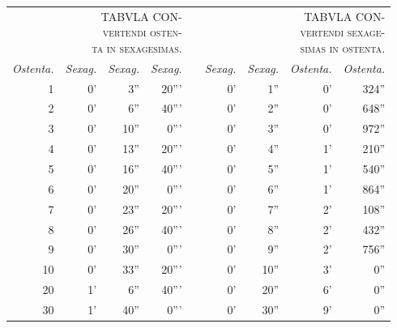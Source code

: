 \begin{parnumbers}
\begin{wraptable}{r}{0mm}
\footnotesize
\setlength{\tabcolsep}{3pt}
\renewcommand{\arraystretch}{1.1}
\begin{tabular}{ |r @{}| r  r  r | c |r | r | r r | }
\multicolumn{4}{p{3cm}}{\parbox[t]{3cm}
 {\scshape\small TABVLA CON-\\
 \footnotesize vertendi osten-\\
 \upshape ta in sexagesimas.}}
& \multicolumn{1}{c}{} &
\multicolumn{4}{p{3cm}}{\parbox[t]{3cm}
 {\scshape\small TABVLA CON-\\
 \footnotesize vertendi sexage-\\
 \upshape simas in ostenta.}}
\\
\cline{1-4} \cline{6-9}
\itshape\scriptsize Ostenta. &
\itshape\scriptsize Sexag. &
\itshape\scriptsize Sexag. &
\itshape\scriptsize Sexag. &
\hspace{5mm} &
\itshape\scriptsize Sexag. &
\itshape\scriptsize Sexag. &
\itshape\scriptsize Ostenta. &
\itshape\scriptsize Ostenta.
\\
\cline{1-4} \cline{6-9}
   1 &  0' &  3'' & 20''' & &  0' &  1'' &    0' & 324'' \\
\cline{2-4} \cline{8-9}
   2 &  0' &  6'' & 40''' & &  0' &  2'' &    0' & 648'' \\
\cline{2-4} \cline{8-9}
   3 &  0' & 10'' &  0''' & &  0' &  3'' &    0' & 972'' \\
\cline{2-4} \cline{8-9}
   4 &  0' & 13'' & 20''' & &  0' &  4'' &    1' & 210'' \\
\cline{2-4} \cline{8-9}
   5 &  0' & 16'' & 40''' & &  0' &  5'' &    1' & 540'' \\
\cline{2-4} \cline{8-9}
   6 &  0' & 20'' &  0''' & &  0' &  6'' &    1' & 864'' \\
\cline{2-4} \cline{8-9}
   7 &  0' & 23'' & 20''' & &  0' &  7'' &    2' & 108'' \\
\cline{2-4} \cline{8-9}
   8 &  0' & 26'' & 40''' & &  0' &  8'' &    2' & 432'' \\
\cline{2-4} \cline{8-9}
   9 &  0' & 30'' &  0''' & &  0' &  9'' &    2' & 756'' \\
\cline{2-4} \cline{8-9}
  10 &  0' & 33'' & 20''' & &  0' & 10'' &    3' &   0'' \\
\cline{2-4} \cline{8-9}
  20 &  1' &  6'' & 40''' & &  0' & 20'' &    6' &   0'' \\
\cline{2-4} \cline{8-9}
  30 &  1' & 40'' &  0''' & &  0' & 30'' &    9' &   0'' \\
\cline{2-4} \cline{8-9}

\end{tabular}
\end{wraptable}
\end{parnumbers}
